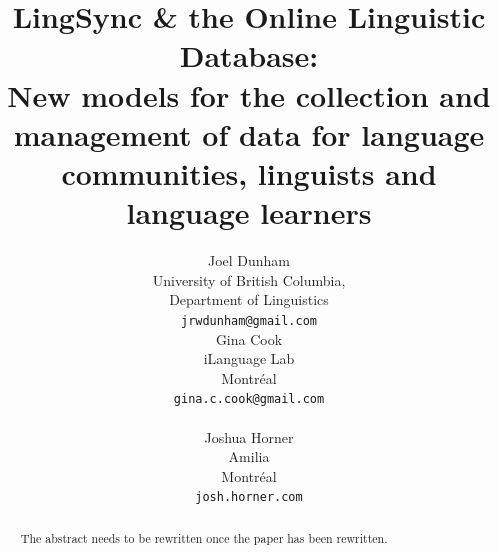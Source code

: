\documentclass[11pt]{article}
\title{LingSync \& the Online Linguistic Database:\\New models for the
    collection and management of data for language communities, linguists and
language learners}
\author{Joel Dunham \\
University of British Columbia,   \\
Department of Linguistics \\
{\tt jrwdunham@gmail.com} \\\And
Gina Cook \\
iLanguage Lab \\
Montr\'eal \\
{\tt gina.c.cook@gmail.com} \\  \\\And
Joshua Horner \\
Amilia  \\
Montr\'eal \\
{\tt josh.horner.com} \\ }
\date{}
\begin{document}
\maketitle

\begin{abstract}
The abstract needs to be rewritten once the paper has been rewritten.
\end{abstract}

\end{document}
